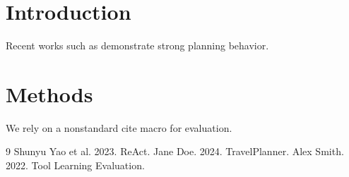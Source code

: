 \section{Introduction}
Recent works such as \citep{BIBREF0,BIBREF1} demonstrate strong planning behavior.

\section{Methods}
We rely on a nonstandard cite macro  for evaluation.

\begin{thebibliography}{9}
 Shunyu Yao et al. 2023. ReAct.
 Jane Doe. 2024. TravelPlanner.
 Alex Smith. 2022. Tool Learning Evaluation.
\end{thebibliography}
